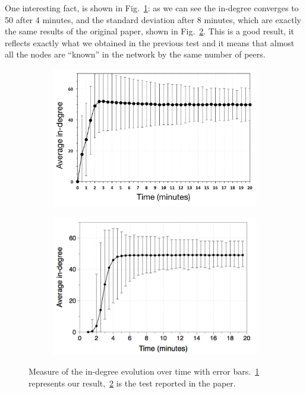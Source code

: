 \newpage
One interesting fact, is shown in Fig.~\ref{fig:indegree_evolution}: as we can see the in-degree converges to 50 after 4 minutes, and the standard deviation after 8 minutes, which are exactly the same results of the original paper, shown in Fig.~\ref{fig:paper_indegree_evolution}. This is a good result, it reflects exactly what we obtained in the previous test and it means that almost all the nodes are ``known'' in the network by the same number of peers.

\begin{figure}
\centering
\begin{subfigure}{.5\textwidth}
  \centering
  \includegraphics[keepaspectratio=true, width=1\linewidth]{images/indegree_evolution}
  \caption{}
  \label{fig:indegree_evolution}
\end{subfigure}%
\begin{subfigure}{.5\textwidth}
  \centering
  \includegraphics[keepaspectratio=true, width=1\linewidth]{images/paper_indegree_evolution}
  \caption{}
  \label{fig:paper_indegree_evolution}
\end{subfigure}
\caption{Measure of the in-degree evolution over time with error bars.~\ref{fig:indegree_evolution} represents our result,~\ref{fig:paper_indegree_evolution} is the test reported in the paper.}
\label{fig:randomness_indegree}
\end{figure}

